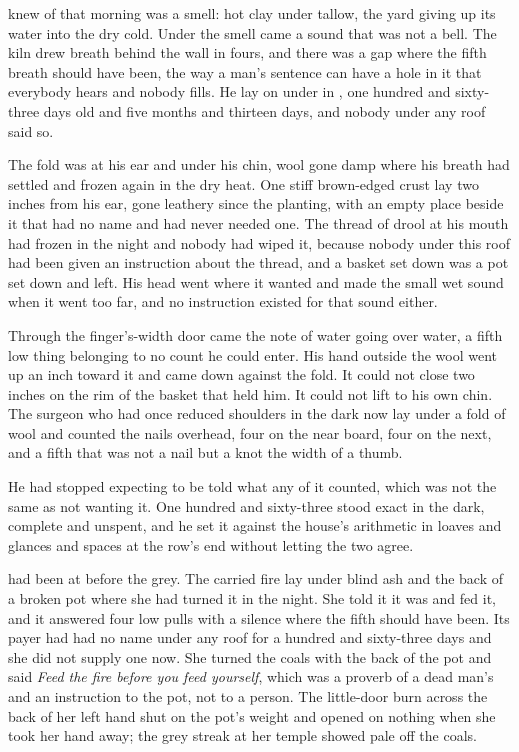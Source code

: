 
  knew of that morning was a smell: hot clay under tallow, the yard giving up its water into the dry cold. Under the smell came a sound that was not a bell. The kiln drew breath behind the wall in fours, and there was a gap where the fifth breath should have been, the way a man's sentence can have a hole in it that everybody hears and nobody fills. He lay on  under  in , one hundred and sixty-three days old and five months and thirteen days, and nobody under any roof said so.

The fold was at his ear and under his chin, wool gone damp where his breath had settled and frozen again in the dry heat. One stiff brown-edged crust lay two inches from his ear, gone leathery since the planting, with an empty place beside it that had no name and had never needed one. The thread of drool at his mouth had frozen in the night and nobody had wiped it, because nobody under this roof had been given an instruction about the thread, and a basket set down was a pot set down and left. His head went where it wanted and made the small wet sound when it went too far, and no instruction existed for that sound either.

Through the finger's-width door came the note of water going over water, a fifth low thing belonging to no count he could enter. His hand outside the wool went up an inch toward it and came down against the fold. It could not close two inches on the rim of the basket that held him. It could not lift to his own chin. The surgeon who had once reduced shoulders in the dark now lay under a fold of wool and counted the nails overhead, four on the near board, four on the next, and a fifth that was not a nail but a knot the width of a thumb.

He had stopped expecting to be told what any of it counted, which was not the same as not wanting it. One hundred and sixty-three stood exact in the dark, complete and unspent, and he set it against the house's arithmetic in loaves and glances and spaces at the row's end without letting the two agree.

 had been at  before the grey. The carried fire lay under blind ash and the back of a broken pot where she had turned it in the night. She told it it was  and fed it, and it answered four low pulls with a silence where the fifth should have been. Its payer had had no name under any roof for a hundred and sixty-three days and she did not supply one now. She turned the coals with the back of the pot and said \emph{Feed the fire before you feed yourself}, which was a proverb of a dead man's and an instruction to the pot, not to a person. The little-door burn across the back of her left hand shut on the pot's weight and opened on nothing when she took her hand away; the grey streak at her temple showed pale off the coals.

